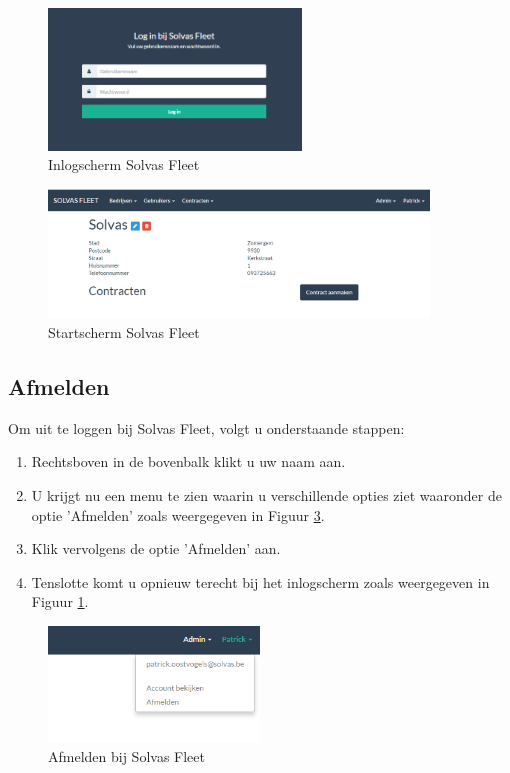 \documentclass[11pt,openany]{article}
\begin{document}
\begin{figure}
	\centering
	\includegraphics[width=0.6\textwidth]{img/fig1.png}
	\caption{Inlogscherm Solvas Fleet} 
	\label{fig:1} 
\end{figure}

\begin{figure}
	\centering
	\includegraphics[width=0.9\textwidth]{img/fig2.png}
	\caption{Startscherm Solvas Fleet} 
	\label{fig:2} 
\end{figure}

\newpage
\subsection{Afmelden}
Om uit te loggen bij Solvas Fleet, volgt u onderstaande stappen:
\begin{enumerate}
	\item Rechtsboven in de bovenbalk klikt u uw naam aan.
	\item U krijgt nu een menu te zien waarin u verschillende opties ziet waaronder de optie 'Afmelden' zoals weergegeven in Figuur \ref{fig:3}.
	\item Klik vervolgens de optie 'Afmelden' aan.
	\item Tenslotte komt u opnieuw terecht bij het inlogscherm zoals weergegeven in Figuur \ref{fig:1}.
\end{enumerate}

\begin{figure}
	\centering
	\includegraphics[width=0.5\textwidth]{img/fig3.png}
	\caption{Afmelden bij Solvas Fleet} 
	\label{fig:3} 
\end{figure}
\end{document}

